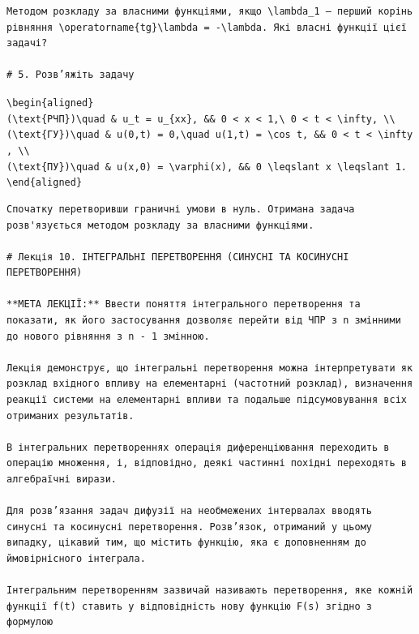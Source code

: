 \documentclass[
  ukrainian,
]{article}
\begin{document}
\begin{verbatim}
Методом розкладу за власними функціями, якщо \lambda_1 — перший корінь рівняння \operatorname{tg}\lambda = -\lambda. Які власні функції цієї задачі?

# 5. Розв’яжіть задачу
\end{verbatim}

\texttt{\textbackslash{}begin\{aligned\}}
\texttt{(\textbackslash{}text\{РЧП\})\textbackslash{}quad\ \&\ u\_t\ =\ u\_\{xx\},\ \&\&\ 0\ \textless{}\ x\ \textless{}\ 1,\textbackslash{}\ 0\ \textless{}\ t\ \textless{}\ \textbackslash{}infty,\ \textbackslash{}\textbackslash{}}
\texttt{(\textbackslash{}text\{ГУ\})\textbackslash{}quad\ \&\ u(0,t)\ =\ 0,\textbackslash{}quad\ u(1,t)\ =\ \textbackslash{}cos\ t,\ \&\&\ 0\ \textless{}\ t\ \textless{}\ \textbackslash{}infty,\ \textbackslash{}\textbackslash{}}
\texttt{(\textbackslash{}text\{ПУ\})\textbackslash{}quad\ \&\ u(x,0)\ =\ \textbackslash{}varphi(x),\ \&\&\ 0\ \textbackslash{}leqslant\ x\ \textbackslash{}leqslant\ 1.}
\texttt{\textbackslash{}end\{aligned\}}

\begin{verbatim}
Спочатку перетворивши граничні умови в нуль. Отримана задача розв'язується методом розкладу за власними функціями.

# Лекція 10. ІНТЕГРАЛЬНІ ПЕРЕТВОРЕННЯ (СИНУСНІ ТА КОСИНУСНІ ПЕРЕТВОРЕННЯ)

**МЕТА ЛЕКЦІЇ:** Ввести поняття інтегрального перетворення та показати, як його застосування дозволяє перейти від ЧПР з n змінними до нового рівняння з n - 1 змінною.

Лекція демонструє, що інтегральні перетворення можна інтерпретувати як розклад вхідного впливу на елементарні (частотний розклад), визначення реакції системи на елементарні впливи та подальше підсумовування всіх отриманих результатів.

В інтегральних перетвореннях операція диференціювання переходить в операцію множення, і, відповідно, деякі частинні похідні переходять в алгебраїчні вирази.

Для розв’язання задач дифузії на необмежених інтервалах вводять синусні та косинусні перетворення. Розв’язок, отриманий у цьому випадку, цікавий тим, що містить функцію, яка є доповненням до ймовірнісного інтеграла.

Інтегральним перетворенням зазвичай називають перетворення, яке кожній функції f(t) ставить у відповідність нову функцію F(s) згідно з формулою
\end{verbatim}
\end{document}
